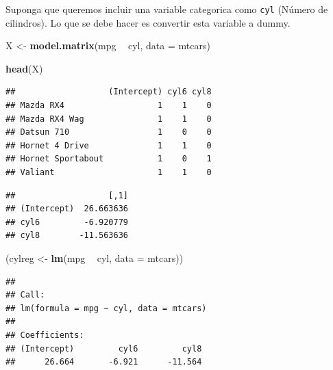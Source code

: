 \documentclass[
  12pt,
]{book}
\newenvironment{Shaded}{\begin{snugshade}}{\end{snugshade}}
\newcommand{\DataTypeTok}[1]{\textcolor[rgb]{0.13,0.29,0.53}{#1}}
\newcommand{\KeywordTok}[1]{\textcolor[rgb]{0.13,0.29,0.53}{\textbf{#1}}}
\newcommand{\NormalTok}[1]{#1}
\newcommand{\OperatorTok}[1]{\textcolor[rgb]{0.81,0.36,0.00}{\textbf{#1}}}
\newcommand{\StringTok}[1]{\textcolor[rgb]{0.31,0.60,0.02}{#1}}
\theoremstyle{definition}
\theoremstyle{definition}
\theoremstyle{definition}
\theoremstyle{remark}
\begin{document}
Suponga que queremos incluir una variable categorica como \texttt{cyl} (Número de cilindros). Lo que se debe hacer es convertir esta variable a dummy.

\begin{Shaded}
\begin{Highlighting}[]
\NormalTok{X <-}\StringTok{ }\KeywordTok{model.matrix}\NormalTok{(mpg }\OperatorTok{~}\StringTok{ }\NormalTok{cyl, }\DataTypeTok{data =}\NormalTok{ mtcars)}

\KeywordTok{head}\NormalTok{(X)}
\end{Highlighting}
\end{Shaded}

\begin{verbatim}
##                   (Intercept) cyl6 cyl8
## Mazda RX4                   1    1    0
## Mazda RX4 Wag               1    1    0
## Datsun 710                  1    0    0
## Hornet 4 Drive              1    1    0
## Hornet Sportabout           1    0    1
## Valiant                     1    1    0
\end{verbatim}

\begin{Shaded}
\end{Shaded}

\begin{verbatim}
##                   [,1]
## (Intercept)  26.663636
## cyl6         -6.920779
## cyl8        -11.563636
\end{verbatim}

\begin{Shaded}
\begin{Highlighting}[]
\NormalTok{(cylreg <-}\StringTok{ }\KeywordTok{lm}\NormalTok{(mpg }\OperatorTok{~}\StringTok{ }\NormalTok{cyl, }\DataTypeTok{data =}\NormalTok{ mtcars))}
\end{Highlighting}
\end{Shaded}

\begin{verbatim}
## 
## Call:
## lm(formula = mpg ~ cyl, data = mtcars)
## 
## Coefficients:
## (Intercept)         cyl6         cyl8  
##      26.664       -6.921      -11.564
\end{verbatim}
\end{document}
